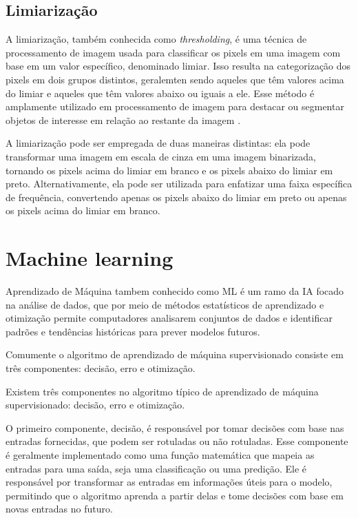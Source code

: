 \subsection[Limiarização]{Limiarização}

A limiarização, também conhecida como \textit{thresholding}, é uma técnica de processamento de imagem usada para classificar os pixels em uma imagem com base em um valor específico, denominado limiar. Isso resulta na categorização dos pixels em dois grupos distintos, geralemten sendo aqueles que têm valores acima do limiar e aqueles que têm valores abaixo ou iguais a ele. Esse método é amplamente utilizado em processamento de imagem para destacar ou segmentar objetos de interesse em relação ao restante da imagem \cite{limiarizacao}.

A limiarização pode ser empregada de duas maneiras distintas: ela pode transformar uma imagem em escala de cinza em uma imagem binarizada, tornando os pixels acima do limiar em branco e os pixels abaixo do limiar em preto. Alternativamente, ela pode ser utilizada para enfatizar uma faixa específica de frequência, convertendo apenas os pixels abaixo do limiar em preto ou apenas os pixels acima do limiar em branco\cite{opencv_thresholding}.


\section[Machine learning]{Machine learning}\label{sec:Machine learning}

Aprendizado de Máquina tambem conhecido como \ac{ML} é um ramo da \ac{IA} focado na análise de dados, que por meio de métodos estatísticos de aprendizado e otimização  permite computadores analisarem conjuntos de dados e identificar padrões e tendências históricas para prever modelos futuros.\cite{ml}

Comumente o algoritmo de aprendizado de máquina supervisionado consiste em três componentes: decisão, erro e otimização. 

Existem três componentes no algoritmo típico de aprendizado de máquina supervisionado: decisão, erro e otimização.


O primeiro componente, decisão, é responsável por tomar decisões com base nas entradas fornecidas, que podem ser rotuladas ou não rotuladas. Esse componente é geralmente implementado como uma função matemática que mapeia as entradas para uma saída, seja uma classificação ou uma predição. Ele é responsável por transformar as entradas em informações úteis para o modelo, permitindo que o algoritmo aprenda a partir delas e tome decisões com base em novas entradas no futuro.


